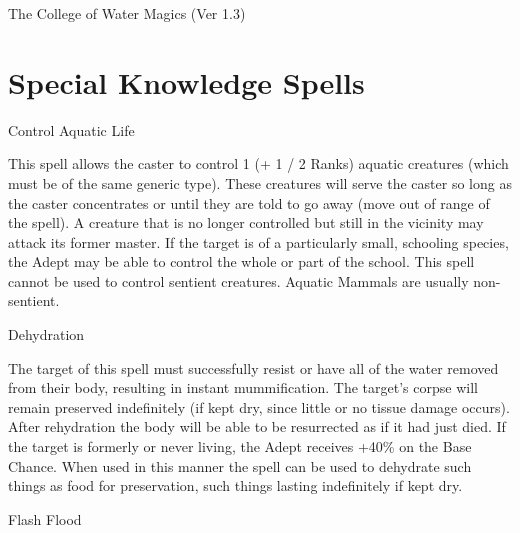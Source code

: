 \begin{Chapter}{The College of Water Magics (Ver 1.3)}
\section{Special Knowledge Spells}

\begin{spell}[S-1]{Control Aquatic Life}

\begin{effects}
This spell allows the caster to control 1 (+ 1 / 2 Ranks) aquatic
creatures (which must be of the same generic type).  These creatures
will serve the caster so long as the caster concentrates or until they
are told to go away (move out of range of the spell).  A creature that
is no longer controlled but still in the vicinity may attack its
former master. If the target is of a particularly small, schooling
species, the Adept may be able to control the whole or part of the
school.  This spell cannot be used to control sentient creatures.
Aquatic Mammals are usually non-sentient.
\end{effects}
\end{spell}

\begin{spell}[S-2]{Dehydration}

\begin{effects}
The target of this spell must successfully resist or have all of the
water removed from their body, resulting in instant mummification.
The target’s corpse will remain preserved indefinitely (if kept dry,
since little or no tissue damage occurs). After rehydration the body
will be able to be resurrected as if it had just died.  If the target
is formerly or never living, the Adept receives +40\% on the Base
Chance. When used in this manner the spell can be used to dehydrate
such things as food for preservation, such things lasting indefinitely
if kept dry.
\end{effects}
\end{spell}

\begin{spell}[S-3]{Flash Flood}


\end{spell}
\end{Chapter}
